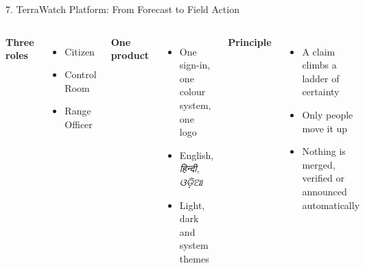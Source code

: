 \begin{frame}{7. TerraWatch Platform: From Forecast to Field Action}
\vspace{0.1cm}
\begin{columns}[T,onlytextwidth]
    \textbf{\textcolor{amritaMaroon}{Three roles}}
    \begin{itemize}\setlength\itemsep{2pt}
        \item Citizen
        \item Control Room
        \item Range Officer
    \end{itemize}
    \textbf{\textcolor{amritaMaroon}{One product}}
    \begin{itemize}\setlength\itemsep{2pt}
        \item One sign-in, one colour system, one logo
        \item English, \textit{हिन्दी}, \textit{ଓଡ଼ିଆ}
        \item Light, dark and system themes
    \end{itemize}
    \textbf{\textcolor{amritaMaroon}{Principle}}
    \begin{itemize}\setlength\itemsep{2pt}
        \item A claim climbs a ladder of certainty
        \item Only people move it up
        \item Nothing is merged, verified or announced automatically
    \end{itemize}
\end{columns}
\end{frame}

